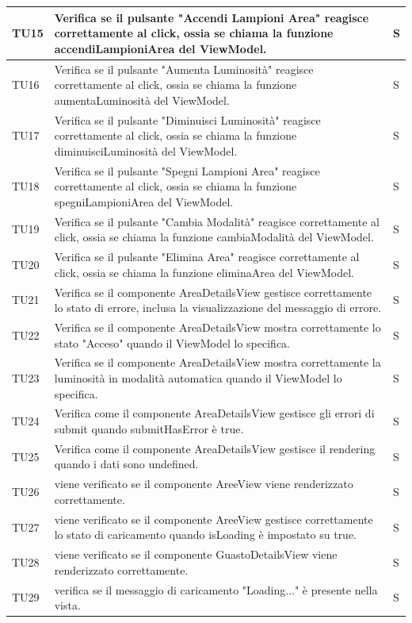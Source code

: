\documentclass[12pt]{article}
\begin{document}
\begin{xltabular}{\linewidth}{|>{\hsize}X|X|>{\hsize}X|}
	TU15 & Verifica se il pulsante "Accendi Lampioni Area" reagisce correttamente al click, ossia se chiama la funzione accendiLampioniArea del ViewModel. & S \\ \hline
	TU16 & Verifica se il pulsante "Aumenta Luminosità" reagisce correttamente al click, ossia se chiama la funzione aumentaLuminosità del ViewModel. & S \\ \hline
	TU17 & Verifica se il pulsante "Diminuisci Luminosità" reagisce correttamente al click, ossia se chiama la funzione diminuisciLuminosità del ViewModel. & S \\ \hline
	TU18 & Verifica se il pulsante "Spegni Lampioni Area" reagisce correttamente al click, ossia se chiama la funzione spegniLampioniArea del ViewModel. & S \\ \hline
	TU19 & Verifica se il pulsante "Cambia Modalità" reagisce correttamente al click, ossia se chiama la funzione cambiaModalità del ViewModel. & S \\ \hline
	TU20 & Verifica se il pulsante "Elimina Area" reagisce correttamente al click, ossia se chiama la funzione eliminaArea del ViewModel. & S \\ \hline
	TU21 & Verifica se il componente AreaDetailsView gestisce correttamente lo stato di errore, inclusa la visualizzazione del messaggio di errore. & S \\ \hline
	TU22 & Verifica se il componente AreaDetailsView mostra correttamente lo stato "Acceso" quando il ViewModel lo specifica. & S \\ \hline
	TU23 & Verifica se il componente AreaDetailsView mostra correttamente la luminosità in modalità automatica quando il ViewModel lo specifica. & S \\ \hline
	TU24 & Verifica come il componente AreaDetailsView gestisce gli errori di submit quando submitHasError è true. & S \\ \hline
	TU25 & Verifica come il componente AreaDetailsView gestisce il rendering quando i dati sono undefined. & S \\ \hline
	TU26 & viene verificato se il componente AreeView viene renderizzato correttamente. & S \\ \hline
	TU27 & viene verificato se il componente AreeView gestisce correttamente lo stato di caricamento quando isLoading è impostato su true. & S \\ \hline
	TU28 & viene verificato se il componente GuastoDetailsView viene renderizzato correttamente. & S \\ \hline
	TU29 & verifica se il messaggio di caricamento "Loading..." è presente nella vista. & S \\ \hline

\end{xltabular}
\end{document}

